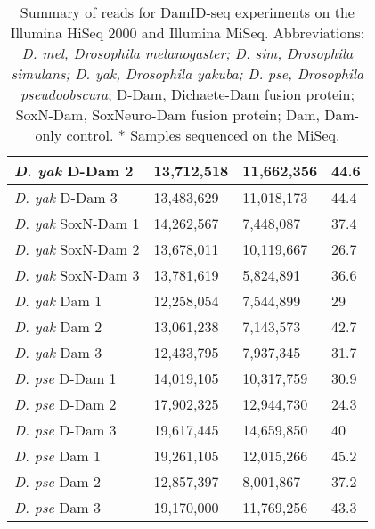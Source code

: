 \begin{table}[!h]
\begin{tabular}{|l|l|l|l|}
\emph{D. yak} D-Dam 2     & 13,712,518  & 11,662,356   & 44.6               \\ \hline
\emph{D. yak} D-Dam 3     & 13,483,629  & 11,018,173   & 44.4               \\ \hline
\emph{D. yak} SoxN-Dam 1  & 14,262,567  & 7,448,087    & 37.4               \\ \hline
\emph{D. yak} SoxN-Dam 2  & 13,678,011  & 10,119,667   & 26.7               \\ \hline
\emph{D. yak} SoxN-Dam 3  & 13,781,619  & 5,824,891    & 36.6               \\ \hline
\emph{D. yak} Dam 1       & 12,258,054  & 7,544,899    & 29                 \\ \hline
\emph{D. yak} Dam 2       & 13,061,238  & 7,143,573    & 42.7               \\ \hline
\emph{D. yak} Dam 3       & 12,433,795  & 7,937,345    & 31.7               \\ \hline
\emph{D. pse} D-Dam 1     & 14,019,105  & 10,317,759   & 30.9               \\ \hline
\emph{D. pse} D-Dam 2     & 17,902,325  & 12,944,730   & 24.3               \\ \hline
\emph{D. pse} D-Dam 3     & 19,617,445  & 14,659,850   & 40                 \\ \hline
\emph{D. pse} Dam 1       & 19,261,105  & 12,015,266   & 45.2               \\ \hline
\emph{D. pse} Dam 2       & 12,857,397  & 8,001,867    & 37.2               \\ \hline
\emph{D. pse} Dam 3       & 19,170,000  & 11,769,256   & 43.3               \\ \hline
\end{tabular}
\caption{Summary of reads for DamID-seq experiments on the Illumina HiSeq 2000 and Illumina MiSeq. Abbreviations: \emph{D. mel, Drosophila melanogaster; D. sim, Drosophila simulans; D. yak, Drosophila yakuba; D. pse, Drosophila pseudoobscura}; D-Dam, Dichaete-Dam fusion protein; SoxN-Dam, SoxNeuro-Dam fusion protein; Dam, Dam-only control. * Samples sequenced on the MiSeq.}
\label{Table 4.1}
\end{table}

